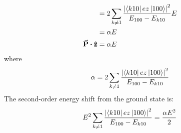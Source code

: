 \documentclass[a4paper,twoside]{article}
\begin{document}
\begin{problem}
\begin{align}
        &= 2 \sum_{k \neq 1} \frac{\abs{\bra{k10} ez\ket{100}}^2}{E_{100} - E_{k10}} E \\
        &= \alpha E \\
        \va{P} \vdot \vu{z} &= \alpha E
    \end{align}
    where
    \begin{equation}
        \alpha = 2 \sum_{k \neq 1} \frac{\abs{\bra{k10} ez\ket{100}}^2}{E_{100} - E_{k10}}
    \end{equation}
    The second-order energy shift from the ground state is:
    \begin{equation}
        E^2\sum_{k \neq 1} \frac{\abs{\bra{k10} ez\ket{100}}^2}{E_{100} - E_{k10}} = \frac{\alpha E^2}{2}
    \end{equation}

\end{problem}
\end{document}
